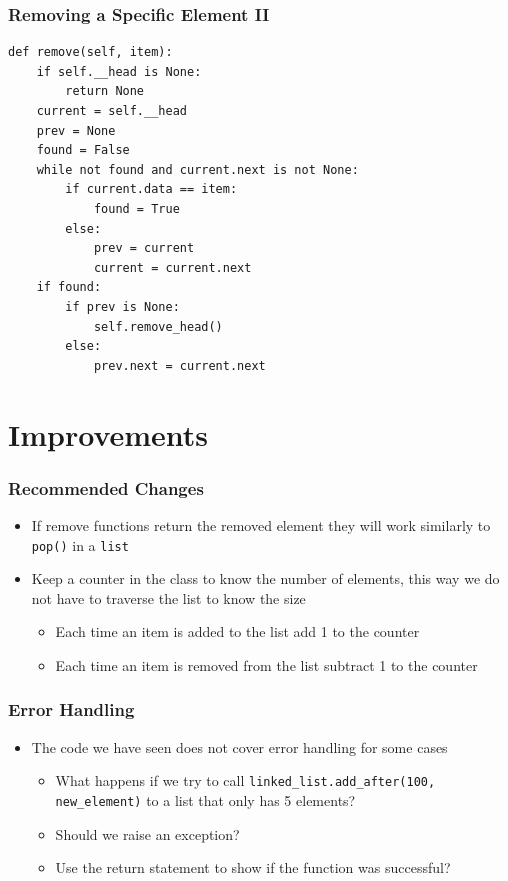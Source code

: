 \documentclass[11pt]{beamer}
\begin{document}
    \begin{frame}[fragile]\frametitle{Removing a Specific Element II}
\begin{lstlisting}[basicstyle=\footnotesize]
def remove(self, item):
	if self.__head is None:
		return None
	current = self.__head
	prev = None
	found = False
	while not found and current.next is not None:
		if current.data == item:
			found = True
		else:
			prev = current
			current = current.next
	if found:
		if prev is None:
			self.remove_head()
		else:
			prev.next = current.next
\end{lstlisting}
    \end{frame}

\section{Improvements}

	\begin{frame}
		\frametitle{Recommended Changes}
		\begin{itemize}
			\item If remove functions return the removed element they will work similarly to \texttt{pop()} in a \texttt{list} 
			\item Keep a counter in the class to know the number of elements, this way we do not have to traverse the list to know the size 
			\begin{itemize}
				\item Each time an item is added to the list add 1 to the counter
				\item Each time an item is removed from the list subtract 1 to the counter
			\end{itemize}
		\end{itemize}
	\end{frame}

	\begin{frame}
		\frametitle{Error Handling}
		\begin{itemize}
			\item The code we have seen does not cover error handling for some cases
			\begin{itemize}
				\item What happens if we try to call \lstinline|linked_list.add_after(100, new_element)| to a list that only has 5 elements?
				\item Should we raise an exception?
				\item Use the return statement to show if the function was successful? 
			\end{itemize}
		\end{itemize}
	\end{frame}
\end{document}
